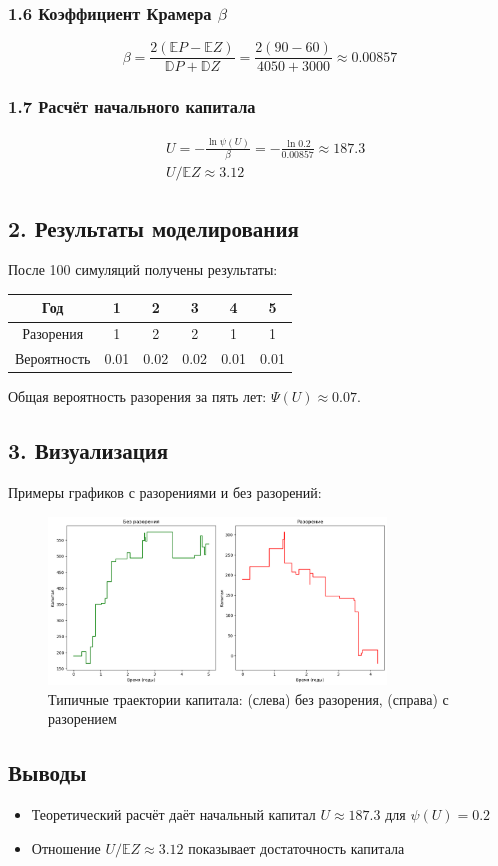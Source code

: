 \documentclass[12pt]{article}
\begin{document}
	\subsubsection*{1.6 Коэффициент Крамера $\beta$}
	\begin{equation*}
		\beta = \frac{2(\mathbb{E}P - \mathbb{E}Z)}{\mathbb{D}P + \mathbb{D}Z} = \frac{2(90 - 60)}{4050 + 3000} \approx 0.00857
	\end{equation*}
	
	\subsubsection*{1.7 Расчёт начального капитала}
	\begin{align*}
		&U = -\frac{\ln \psi(U)}{\beta} = -\frac{\ln 0.2}{0.00857} \approx 187.3\\
		&U/\mathbb{E}Z \approx 3.12
	\end{align*}
	
	\subsection*{2. Результаты моделирования}
	После 100 симуляций получены результаты:
		\begin{center}
		\begin{tabular}{cccccc}
			\toprule
			Год & 1 & 2 & 3 & 4 & 5 \\
			\midrule
			Разорения & 1 & 2 & 2 & 1 & 1 \\
			Вероятность & 0.01 & 0.02 & 0.02 & 0.01 & 0.01 \\
			\bottomrule
		\end{tabular}
		\end{center}
		Общая вероятность разорения за пять лет: $\Psi(U) \approx 0.07$.

	\subsection*{3. Визуализация}
		Примеры графиков с разорениями и без разорений:
	\begin{figure}[h]
		\centering
		\includegraphics[width=0.8\textwidth]{task4.png}
		\caption{Типичные траектории капитала: (слева) без разорения, (справа) с разорением}
	\end{figure}
	
	\subsection*{Выводы}
	\begin{itemize}
		\item Теоретический расчёт даёт начальный капитал $U \approx 187.3$ для $\psi(U)=0.2$
		\item Отношение $U/\mathbb{E}Z \approx 3.12$ показывает достаточность капитала
	\end{itemize}
\end{document}
